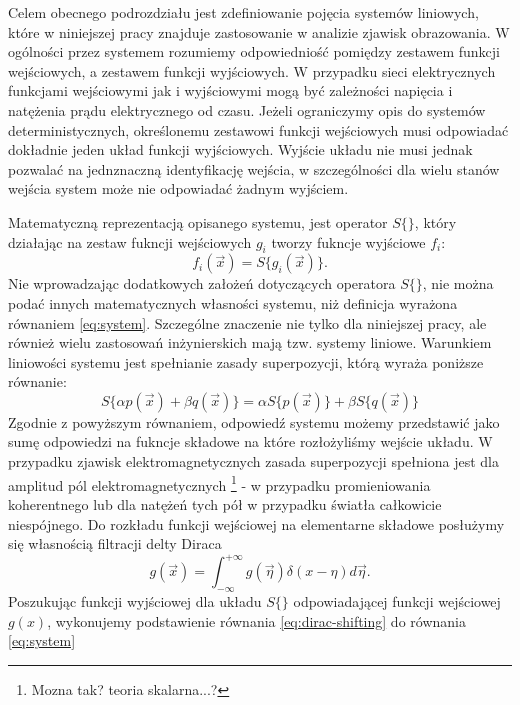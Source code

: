 Celem obecnego podrozdziału jest zdefiniowanie pojęcia systemów liniowych, które w niniejszej pracy znajduje zastosowanie w analizie zjawisk obrazowania. W ogólności przez systemem rozumiemy odpowiedniość pomiędzy zestawem funkcji wejściowych, a zestawem funkcji wyjściowych. W przypadku sieci elektrycznych funkcjami wejściowymi jak i wyjściowymi mogą być zależności napięcia i natężenia prądu elektrycznego od czasu. Jeżeli ograniczymy opis do systemów deterministycznych, określonemu zestawowi funkcji wejściowych musi odpowiadać dokładnie jeden układ funkcji wyjściowych. Wyjście układu nie musi jednak pozwalać na jednznaczną identyfikację wejścia, w szczególności dla wielu stanów wejścia system może nie odpowiadać żadnym wyjściem.

Matematyczną reprezentacją opisanego systemu, jest operator $S\{\}$, który działając na zestaw fukncji wejściowych $g_i$ tworzy fukncje wyjściowe $f_i$:
\begin{equation}
f_i(\vec{x})=S\{g_i(\vec{x})\}.
\label{eq:system}
\end{equation} 
Nie wprowadzając dodatkowych założeń dotyczących operatora $S\{\}$, nie można podać innych matematycznych własności systemu, niż definicja wyrażona równaniem \ref{eq:system}. Szczególne znaczenie nie tylko dla niniejszej pracy, ale również wielu zastosowań inżynierskich mają tzw. systemy liniowe. Warunkiem liniowości systemu jest spełnianie zasady superpozycji, którą wyraża poniższe równanie:
\begin{equation}
S\{\alpha p(\vec{x}) + \beta q(\vec{x})\} = \alpha S\{p(\vec{x})\} + \beta S\{q(\vec{x})\}
\label{eq:lin-system}
\end{equation}
Zgodnie z powyższym równaniem, odpowiedź systemu możemy przedstawić jako sumę odpowiedzi na fukncje składowe na które rozłożyliśmy wejście układu. W przypadku zjawisk elektromagnetycznych zasada superpozycji spełniona jest dla amplitud pól elektromagnetycznych \footnote{Mozna tak? teoria skalarna...?} - w przypadku promieniowania koherentnego lub dla natężeń tych pół w przypadku światła całkowicie niespójnego.  Do rozkładu funkcji wejściowej na elementarne składowe posłużymy się własnością filtracji delty Diraca
\begin{equation}
g(\vec{x})=\int_{-\infty}^{+\infty} g(\vec{\eta}) \delta(x-\eta) d \vec{\eta}.
\label{eq:dirac-shifting}
\end{equation}
Poszukując funkcji wyjściowej dla układu $S\{\}$ odpowiadającej funkcji wejściowej $g(x)$, wykonujemy podstawienie równania \ref{eq:dirac-shifting} do równania \ref{eq:system} 
